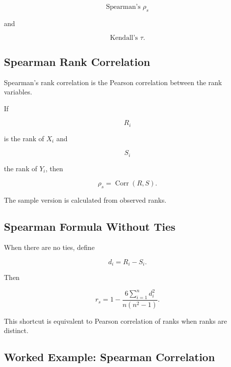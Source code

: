 \[
\boxed{
\text{Spearman's }\rho_s
}
\]

and

\[
\boxed{
\text{Kendall's }\tau.
}
\]

\subsection{Spearman Rank Correlation}
\label{subsec:spearman-rank-correlation}

Spearman's rank correlation is the Pearson correlation between the rank
variables.

If

\[
R_i
\]

is the rank of \(X_i\) and

\[
S_i
\]

the rank of \(Y_i\), then

\[
\boxed{
\rho_s
=
\operatorname{Corr}(R,S).
}
\]

The sample version is calculated from observed ranks.

\subsection{Spearman Formula Without Ties}
\label{subsec:spearman-no-ties}

When there are no ties, define

\[
d_i
=
R_i-S_i.
\]

Then

\[
\boxed{
r_s
=
1
-
\frac{
6\sum_{i=1}^{n}d_i^2
}{
n(n^2-1)
}.
}
\]

This shortcut is equivalent to Pearson correlation of ranks when ranks
are distinct.

\subsection{Worked Example: Spearman Correlation}
\label{subsec:worked-spearman}

